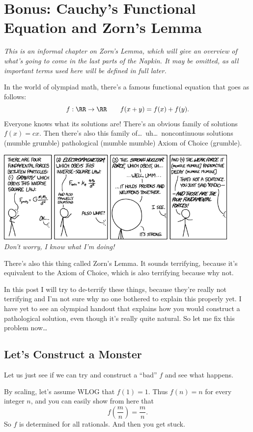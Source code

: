 \chapter{Bonus: Cauchy's Functional Equation and Zorn's Lemma}
\emph{This is an informal chapter on Zorn's Lemma,
which will give an overview of what's going to come in the last parts of the Napkin.
It may be omitted, as all important terms used here will be defined in full later.}

In the world of olympiad math, there's a famous functional equation that goes as follows: 
\[ f : \RR \to \RR \qquad f(x+y) = f(x) + f(y). \]
Everyone knows what its solutions are!
There's an obvious family of solutions $f(x) = cx$.
Then there's also this family of\dots\ uh\dots\ noncontinuous solutions (mumble grumble) pathological 
(mumble mumble) Axiom of Choice (grumble).

\begin{center}
	\includegraphics[width=12cm]{media/xkcd-fundamental-forces.png} \\[1em]
	\emph{Don't worry, I know what I'm doing!}
\end{center}

There's also this thing called Zorn's Lemma. It sounds terrifying,
because it's equivalent to the Axiom of Choice, which is also terrifying because why not.

In this post I will try to de-terrify these things,
because they're really not terrifying
and I'm not sure why no one bothered to explain this properly yet.
I have yet to see an olympiad handout that explains how you would construct
a pathological solution, even though it's really quite natural.
So let me fix this problem now\dots

\section{Let's Construct a Monster}
Let us just see if we can try and construct a ``bad'' $f$ and see what happens.

By scaling, let's assume WLOG that $f(1) = 1$.
Thus $f(n) = n$ for every integer $n$, and you can easily show from here that
\[ f\left( \frac mn \right) = \frac mn. \]
So $f$ is determined for all rationals. And then you get stuck.

